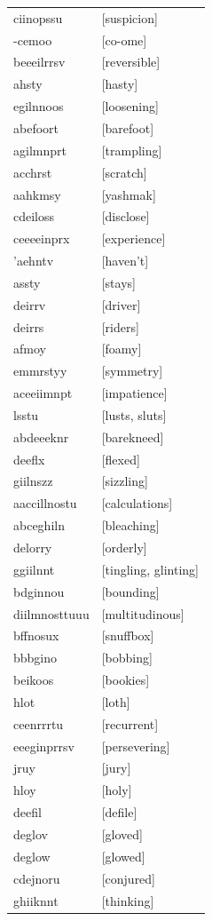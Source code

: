\documentclass{article}
\begin{document}
\begin{tabular}{ll}
ciinopssu & [suspicion] \\
-cemoo & [co-ome] \\
beeeilrrsv & [reversible] \\
ahsty & [hasty] \\
egilnnoos & [loosening] \\
abefoort & [barefoot] \\
agilmnprt & [trampling] \\
acchrst & [scratch] \\
aahkmsy & [yashmak] \\
cdeiloss & [disclose] \\
ceeeeinprx & [experience] \\
'aehntv & [haven't] \\
assty & [stays] \\
deirrv & [driver] \\
deirrs & [riders] \\
afmoy & [foamy] \\
emmrstyy & [symmetry] \\
aceeiimnpt & [impatience] \\
lsstu & [lusts, sluts] \\
abdeeeknr & [barekneed] \\
deeflx & [flexed] \\
giilnszz & [sizzling] \\
aaccillnostu & [calculations] \\
abceghiln & [bleaching] \\
delorry & [orderly] \\
ggiilnnt & [tingling, glinting] \\
bdginnou & [bounding] \\
diilmnosttuuu & [multitudinous] \\
bffnosux & [snuffbox] \\
bbbgino & [bobbing] \\
beikoos & [bookies] \\
hlot & [loth] \\
ceenrrrtu & [recurrent] \\
eeeginprrsv & [persevering] \\
jruy & [jury] \\
hloy & [holy] \\
deefil & [defile] \\
deglov & [gloved] \\
deglow & [glowed] \\
cdejnoru & [conjured] \\
ghiiknnt & [thinking] \\

\end{tabular}
\end{document}
